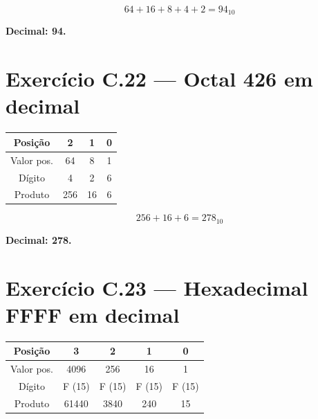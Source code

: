 \documentclass[11pt,a4paper]{article}
\begin{document}
\[
64 + 16 + 8 + 4 + 2 = \boxed{94_{10}}
\]

\begin{resposta}\textbf{Decimal: 94.}\end{resposta}

\section{Exerc\'icio C.22 --- Octal 426 em decimal}

\begin{center}
\renewcommand{\arraystretch}{1.2}
\begin{tabular}{|c|c|c|c|}
\hline
Posi\c{c}\~ao    & 2   & 1  & 0 \\
\hline
Valor pos. & 64  & 8  & 1 \\
\hline
D\'igito    & 4   & 2  & 6 \\
\hline
Produto   & 256 & 16 & 6 \\
\hline
\end{tabular}
\end{center}

\[
256 + 16 + 6 = \boxed{278_{10}}
\]

\begin{resposta}\textbf{Decimal: 278.}\end{resposta}

\newpage
\section{Exerc\'icio C.23 --- Hexadecimal FFFF em decimal}

\begin{center}
\renewcommand{\arraystretch}{1.2}
\begin{tabular}{|c|c|c|c|c|}
\hline
Posi\c{c}\~ao        & 3      & 2     & 1   & 0 \\
\hline
Valor pos.     & 4096   & 256   & 16  & 1 \\
\hline
D\'igito        & F (15) & F (15)& F (15) & F (15) \\
\hline
Produto       & 61440  & 3840  & 240 & 15 \\
\hline
\end{tabular}
\end{center}
\end{document}
